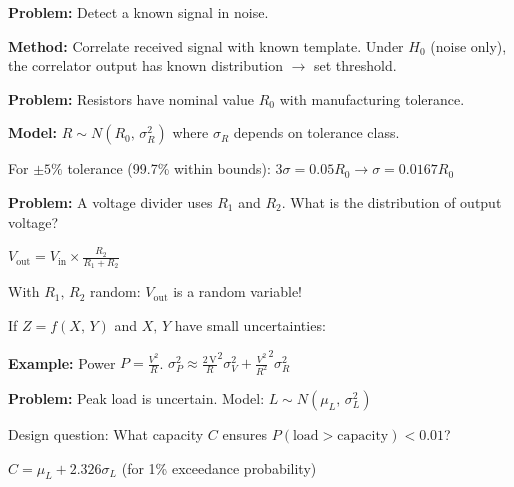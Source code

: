 
\textbf{Problem:} Detect a known signal in noise.

\textbf{Method:} Correlate received signal with known template. Under $H_{0}$ (noise only), the correlator output has known distribution \ensuremath{\to} set threshold.



\textbf{Problem:} Resistors have nominal value $R_{0}$ with manufacturing tolerance.

\textbf{Model:} $R \sim N(R_{0},\, \sigma_{R}^{2})$ where $\sigma_{R}$ depends on tolerance class.

For $\pm 5\%$ tolerance (99.7\% within bounds): $3\sigma = 0.05R_{0} \to \sigma = 0.0167R_{0}$


\textbf{Problem:} A voltage divider uses $R_{1}$ and $R_{2}$. What is the distribution of output voltage?

$\displaystyle V_{\mathrm{out}} = V_{\mathrm{in}} \times \frac{R_{2}}{R_{1} + R_{2}}$

With $R_{1},\, R_{2}$ random: $V_{\mathrm{out}}$ is a random variable!


If $Z = f(X,\, Y)$ and $X,\, Y$ have small uncertainties:


\textbf{Example:} Power $P = \frac{V^{2}}{R}$. $\sigma_{P}^{2} \approx \frac{2\,\mathrm{V}}{R}^{2}\sigma_{V}^{2} + \frac{V^{2}}{R^{2}}^{2}\sigma_{R}^{2}$



\textbf{Problem:} Peak load is uncertain. Model: $L \sim N(\mu_{L},\, \sigma_{L}^{2})$

Design question: What capacity $C$ ensures $P(\text{load} > \text{capacity}) < 0.01$?

$C = \mu_{L} + 2.326\sigma_{L}$ (for 1\% exceedance probability)



